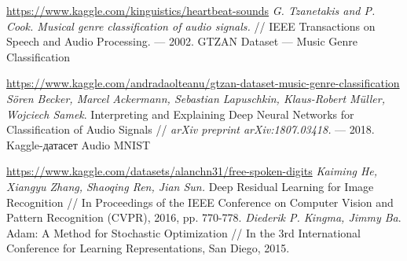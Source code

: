 \documentclass[12pt, fleqn]{article}
\begin{document}
\begin{thebibliography}{3}
	\url{https://www.kaggle.com/kinguistics/heartbeat-sounds}
    \textit{G. Tzanetakis and P. Cook. Musical genre classification of audio signals.}    // IEEE Transactions on Speech and Audio Processing. --- 2002.
    GTZAN Dataset --- Music Genre Classification
    
    \url{https://www.kaggle.com/andradaolteanu/gtzan-dataset-music-genre-classification}
    \textit{Sören Becker, Marcel Ackermann, Sebastian Lapuschkin, Klaus-Robert Müller, Wojciech Samek}. Interpreting and Explaining Deep Neural Networks for Classification of Audio Signals // \textit{arXiv preprint arXiv:1807.03418.} --- 2018.
    Kaggle-датасет Audio MNIST
    
    \url{https://www.kaggle.com/datasets/alanchn31/free-spoken-digits}
    \textit{Kaiming He, Xiangyu Zhang, Shaoqing Ren, Jian Sun.} Deep Residual Learning for Image Recognition // In Proceedings of the IEEE Conference on Computer Vision and Pattern Recognition (CVPR), 2016, pp. 770-778.
	\textit{Diederik P. Kingma, Jimmy Ba}. Adam: A Method for Stochastic Optimization // In the 3rd International Conference for Learning Representations, San Diego, 2015.
	
\end{thebibliography}
\end{document}
